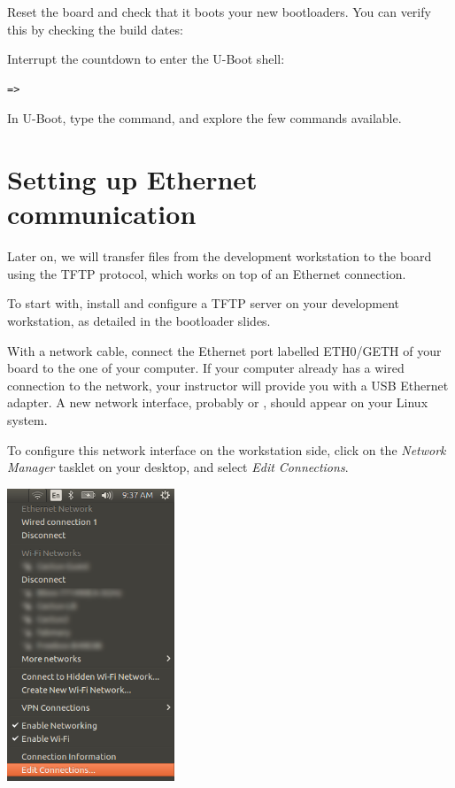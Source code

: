 Reset the board and check that it boots your new bootloaders. You can
verify this by checking the build dates:



Interrupt the countdown to enter the U-Boot shell:
\begin{verbatim}
=>
\end{verbatim}

In U-Boot, type the  command, and explore the few commands
available.

\section{Setting up Ethernet communication}

Later on, we will transfer files from the development workstation to
the board using the TFTP protocol, which works on top of an Ethernet
connection.

To start with, install and configure a TFTP server on your development
workstation, as detailed in the bootloader slides.

With a network cable, connect the Ethernet port labelled ETH0/GETH of
your board to the one of your computer. If your computer already has a
wired connection to the network, your instructor will provide you with
a USB Ethernet adapter. A new network interface, probably 
or , should appear on your Linux system.

To configure this network interface on the workstation side, click on
the {\em Network Manager} tasklet on your desktop, and select {\em
  Edit Connections}.

\begin{center}
\includegraphics[width=5cm]{labs/sysdev-u-boot/network-config-1.png}
\end{center}

